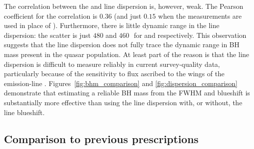 The correlation between the \ha and  line dispersion is, however, weak.
The Pearson coefficient for the correlation is $0.36$ (and just $0.15$ when the \hb measurements are used in place of \hans).
Furthermore, there is little dynamic range in the line dispersion: the scatter is just $480$ and $460$\,\kms\, for \ha and  respectively.
This observation suggests that the line dispersion does not fully trace the dynamic range in BH mass present in the quasar population.
At least part of the reason is that the line dispersion is difficult to measure reliably in current survey-quality data, particularly because of the sensitivity to flux ascribed to the wings of the emission-line \citep[e.g.][]{mejia-restrepo16}.
Figures~\ref{fig:bhm_comparison} and \ref{fig:dispersion_comparison} demonstrate that estimating a reliable BH mass from the  FWHM and blueshift is substantially more effective than using the  line dispersion with, or without, the line blueshift.

\subsection{Comparison to previous prescriptions}

